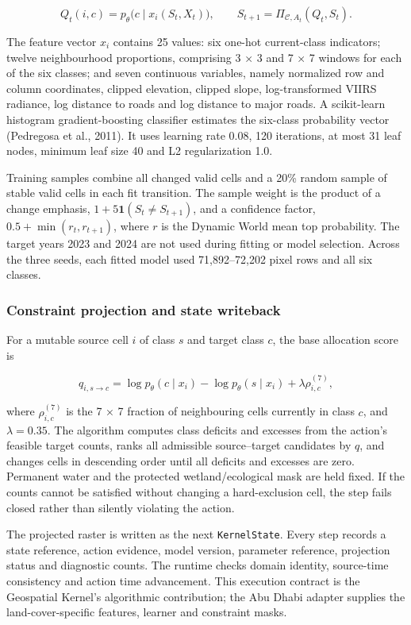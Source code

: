 \documentclass[
]{article}
\begin{document}
\[
Q_t(i,c)=p_\theta\big(c\mid x_i(S_t,X_t)\big),
\qquad
S_{t+1}=\Pi_{\mathcal C,A_t}(Q_t,S_t).
\]

The feature vector \(x_i\) contains 25 values: six one-hot current-class
indicators; twelve neighbourhood proportions, comprising 3 × 3 and 7 × 7
windows for each of the six classes; and seven continuous variables,
namely normalized row and column coordinates, clipped elevation, clipped
slope, log-transformed VIIRS radiance, log distance to roads and log
distance to major roads. A scikit-learn histogram gradient-boosting
classifier estimates the six-class probability vector (Pedregosa et al.,
2011). It uses learning rate 0.08, 120 iterations, at most 31 leaf
nodes, minimum leaf size 40 and L2 regularization 1.0.

Training samples combine all changed valid cells and a 20\% random
sample of stable valid cells in each fit transition. The sample weight
is the product of a change emphasis, \(1+5\mathbf{1}(S_t\ne S_{t+1})\),
and a confidence factor, \(0.5+\min(r_t,r_{t+1})\), where \(r\) is the
Dynamic World mean top probability. The target years 2023 and 2024 are
not used during fitting or model selection. Across the three seeds, each
fitted model used 71,892--72,202 pixel rows and all six classes.

\subsubsection{Constraint projection and state
writeback}\label{constraint-projection-and-state-writeback}

For a mutable source cell \(i\) of class \(s\) and target class \(c\),
the base allocation score is

\[
q_{i,s\rightarrow c}=\log p_\theta(c\mid x_i)-\log p_\theta(s\mid x_i)+\lambda\rho^{(7)}_{i,c},
\]

where \(\rho^{(7)}_{i,c}\) is the 7 × 7 fraction of neighbouring cells
currently in class \(c\), and \(\lambda=0.35\). The algorithm computes
class deficits and excesses from the action's feasible target counts,
ranks all admissible source--target candidates by \(q\), and changes
cells in descending order until all deficits and excesses are zero.
Permanent water and the protected wetland/ecological mask are held
fixed. If the counts cannot be satisfied without changing a
hard-exclusion cell, the step fails closed rather than silently
violating the action.

The projected raster is written as the next \texttt{KernelState}. Every
step records a state reference, action evidence, model version,
parameter reference, projection status and diagnostic counts. The
runtime checks domain identity, source-time consistency and action time
advancement. This execution contract is the Geospatial Kernel's
algorithmic contribution; the Abu Dhabi adapter supplies the
land-cover-specific features, learner and constraint masks.
\end{document}
